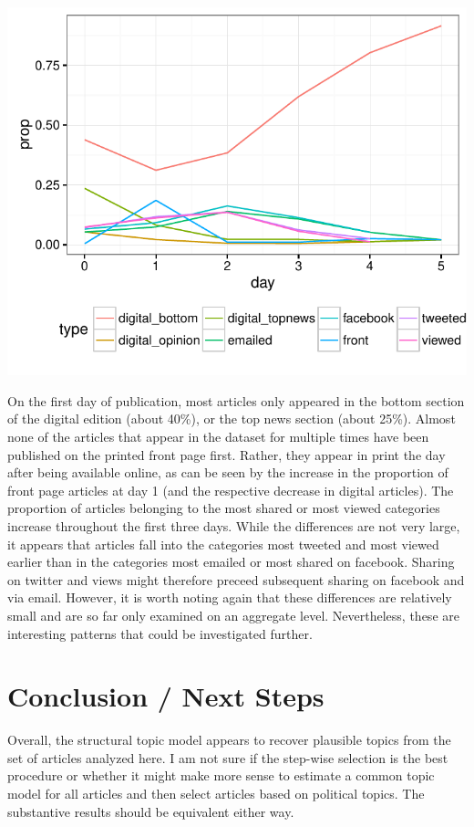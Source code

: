 \documentclass[12pt]{article}\usepackage[]{graphicx}\usepackage[]{color}
\makeatletter
\def\maxwidth{ %
  \ifdim\Gin@nat@width>\linewidth
    \linewidth
  \else
    \Gin@nat@width
  \fi
}
\newenvironment{knitrout}{}{} %
\makeatother
\begin{document}
\begin{knitrout}
\color{fgcolor}
\includegraphics[width=\maxwidth]{figure/unnamed-chunk-11-1} 

\end{knitrout}

On the first day of publication, most articles only appeared in the bottom section of the digital edition (about 40\%), or the top news section (about 25\%). Almost none of the articles that appear in the dataset for multiple times have been published on the printed front page first. Rather, they appear in print the day after being available online, as can be seen by the increase in the proportion of front page articles at day 1 (and the respective decrease in digital articles). The proportion of articles belonging to the most shared or most viewed categories increase throughout the first three days. While the differences are not very large, it appears that articles fall into the categories most tweeted and most viewed earlier than in the categories most emailed or most shared on facebook. Sharing on twitter and views might therefore preceed subsequent sharing on facebook and via email. However, it is worth noting again that these differences are relatively small and are so far only examined on an aggregate level. Nevertheless, these are interesting patterns that could be investigated further.


\clearpage
\section{Conclusion / Next Steps}
Overall, the structural topic model appears to recover plausible topics from the set of articles analyzed here. I am not sure if the step-wise selection is the best procedure or whether it might make more sense to estimate a common topic model for all articles and then select articles based on political topics. The substantive results should be equivalent either way.
\end{document}
